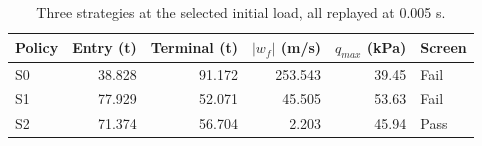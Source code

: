 \begin{table}[htbp]
\centering\small
\caption{Three strategies at the selected initial load, all replayed at 0.005 s.}
\label{tab:strategy}
\begin{tabularx}{\linewidth}{@{}lrrrrX@{}}
\toprule
Policy & Entry (t) & Terminal (t) & $|w_f|$ (m/s) & $q_{max}$ (kPa) & Screen \\
\midrule
S0 & 38.828 & 91.172 & 253.543 & 39.45 & Fail \\
S1 & 77.929 & 52.071 & 45.505 & 53.63 & Fail \\
S2 & 71.374 & 56.704 & 2.203 & 45.94 & Pass \\
\bottomrule
\end{tabularx}
\par{}
\end{table}
